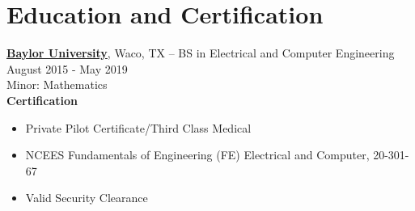 \documentclass[11pt]{article}       %
\begin{document}



\vspace{-18.5pt}

\section*{Education and Certification}
\textbf{\href{https://www.baylor.edu/}{Baylor University}}, Waco, TX -- BS in Electrical and Computer Engineering \hfill August 2015 - May 2019 \\
Minor: Mathematics\\

\textbf{Certification}
\begin{itemize}
   \item Private Pilot Certificate/Third Class Medical
   \item NCEES Fundamentals of Engineering (FE) Electrical and Computer, 20-301-67
   \item Valid Security Clearance
\end{itemize}
\end{document}
